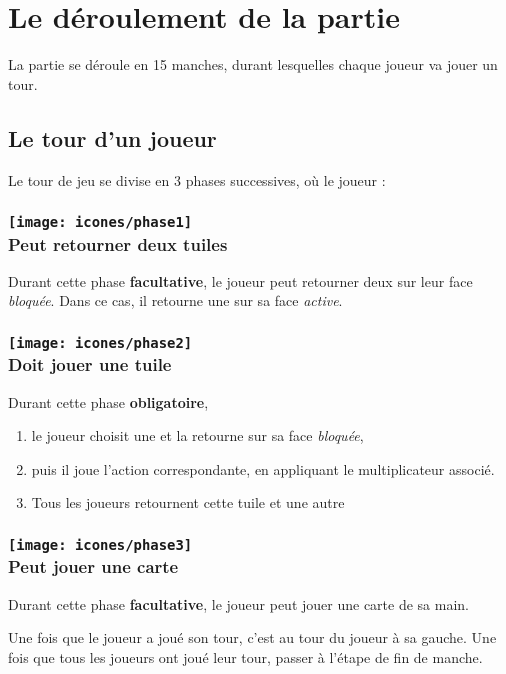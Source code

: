 \section*{Le déroulement de la partie} \label{sec:tourDeJeu}
La partie se déroule en 15 manches, durant lesquelles chaque joueur va jouer un tour.

\subsection*{Le tour d'un joueur} \label{sec:tourDeJoueur}
Le tour de jeu se divise en 3 phases successives, où le joueur :
\subsubsection*{\texttt{[image: icones/phase1]} \\ Peut retourner deux tuiles}
Durant cette phase \textbf{facultative}, le joueur peut retourner deux \tuilesActives sur leur face \textit{bloquée}. Dans ce cas, il retourne une \tuileBloquee sur sa face \textit{active}.

\subsubsection*{\texttt{[image: icones/phase2]} \\ Doit jouer une tuile}
Durant cette phase \textbf{obligatoire},
\begin{enumerate}
\item le joueur choisit une \tuileActive et la retourne sur sa face \textit{bloquée},
\item puis il joue l'action correspondante, en appliquant le multiplicateur associé.
\item Tous les joueurs retournent cette tuile et une autre
\end{enumerate}

\subsubsection*{\texttt{[image: icones/phase3]} \\ Peut jouer une carte}
Durant cette phase \textbf{facultative}, le joueur peut jouer une carte de sa main.

Une fois que le joueur a joué son tour, c'est au tour du joueur à sa gauche. Une fois que tous les joueurs ont joué leur tour, passer à l'étape de fin de manche.

